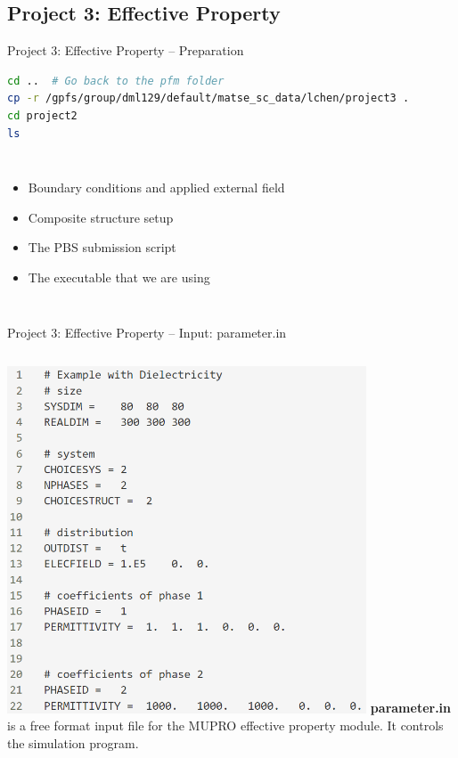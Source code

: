 \documentclass[11pt,aspectratio=169]{beamer}
\begin{document}
\subsection[Project 3: Effective Property]{Project 3: Effective Property}
\begin{frame}[fragile]{Project 3: Effective Property -- Preparation}
\small{
\begin{lstlisting}[language=bash]
cd ..  # Go back to the pfm folder
cp -r /gpfs/group/dml129/default/matse_sc_data/lchen/project3 .
cd project2
ls
\end{lstlisting}
}
\begin{columns}
    \begin{itemize}
        \item [parameter.in] Boundary conditions and applied external field 
        \item [struct.in] Composite structure setup 
        \item [eff.pbs] The PBS submission script
        \item [EffProperty.exe] The executable that we are using
    \end{itemize}
\end{columns}
\end{frame}

\begin{frame}[fragile]{Project 3: Effective Property -- Input: parameter.in}
\begin{columns}
\centering
\vskip 0.5cm
\includegraphics[width=0.8\textwidth]{img/eff_param.png}
\justify
{\bf parameter.in} is a free format input file for the MUPRO effective property module. It controls the simulation program.
\end{columns}
\end{frame}
\end{document}
